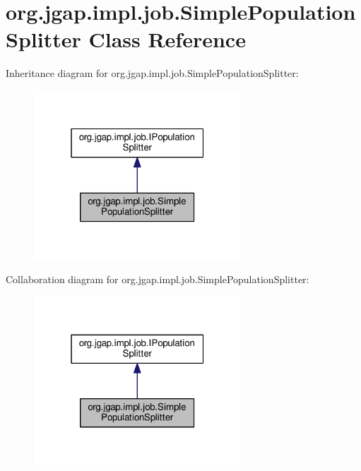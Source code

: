 \hypertarget{classorg_1_1jgap_1_1impl_1_1job_1_1_simple_population_splitter}{\section{org.\-jgap.\-impl.\-job.\-Simple\-Population\-Splitter Class Reference}
\label{classorg_1_1jgap_1_1impl_1_1job_1_1_simple_population_splitter}
}


Inheritance diagram for org.\-jgap.\-impl.\-job.\-Simple\-Population\-Splitter\-:
\nopagebreak
\begin{figure}[H]
\begin{center}
\leavevmode
\includegraphics[width=220pt]{classorg_1_1jgap_1_1impl_1_1job_1_1_simple_population_splitter__inherit__graph}
\end{center}
\end{figure}


Collaboration diagram for org.\-jgap.\-impl.\-job.\-Simple\-Population\-Splitter\-:
\nopagebreak
\begin{figure}[H]
\begin{center}
\leavevmode
\includegraphics[width=220pt]{classorg_1_1jgap_1_1impl_1_1job_1_1_simple_population_splitter__coll__graph}
\end{center}
\end{figure}
